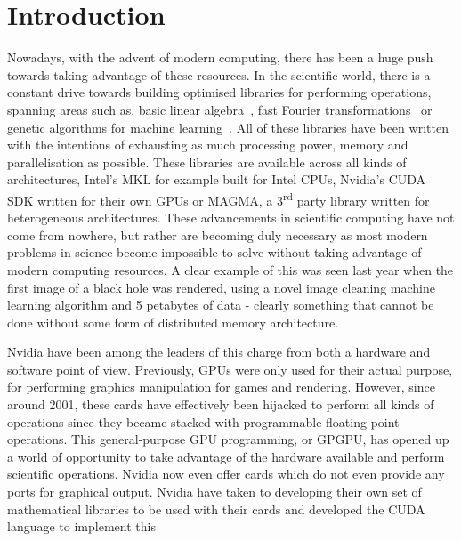 \clearpage
\chapter{Introduction}

Nowadays, with the advent of modern computing, there has been a huge push towards taking advantage of these resources. In the scientific world, there is a constant drive towards building optimised libraries for performing operations, spanning areas such as, basic linear algebra~\cite{blas}, fast Fourier transformations~\cite{fftw} or genetic algorithms for machine learning~\cite{galib}. All of these libraries have been written with the intentions of exhausting as much processing power, memory and parallelisation as possible. These libraries are available across all kinds of architectures, Intel's MKL for example built for Intel CPUs, Nvidia's CUDA SDK written for their own GPUs or MAGMA, a 3\textsuperscript{rd} party library written for heterogeneous architectures. These advancements in scientific computing have not come from nowhere, but rather are becoming duly necessary as most modern problems in science become impossible to solve without taking advantage of modern computing resources. A clear example of this was seen last year when the first image of a black hole was rendered, using a novel image cleaning machine learning algorithm and 5 petabytes of data - clearly something that cannot be done without some form of distributed memory architecture.

Nvidia have been among the leaders of this charge from both a hardware and software point of view. Previously, GPUs were only used for their actual purpose, for performing graphics manipulation for games and rendering. However, since around 2001, these cards have effectively been hijacked to perform all kinds of operations since they became stacked with programmable floating point operations. This general-purpose GPU programming, or GPGPU, has opened up a world of opportunity to take advantage of the hardware available and perform scientific operations. Nvidia now even offer cards which do not even provide any ports for graphical output. Nvidia have taken to developing their own set of mathematical libraries to be used with their cards and developed the CUDA language to implement this%

